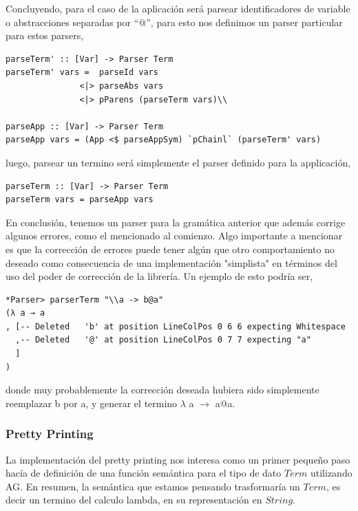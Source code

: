 \documentclass[a4paper,10pt]{article}
\begin{document}
Concluyendo, para el caso de la aplicación será parsear identificadores de variable
o abstracciones separadas por ``$@$'', para esto nos definimos un parser particular
para estos parsers,

\begin{lstlisting}
parseTerm' :: [Var] -> Parser Term
parseTerm' vars =  parseId vars
               <|> parseAbs vars
               <|> pParens (parseTerm vars)\\

parseApp :: [Var] -> Parser Term
parseApp vars = (App <$ parseAppSym) `pChainl` (parseTerm' vars)
\end{lstlisting}

luego, parsear un termino será simplemente el parser definido para la applicación,\\

\begin{lstlisting}
parseTerm :: [Var] -> Parser Term
parseTerm vars = parseApp vars
\end{lstlisting}

En conclusión, tenemos un parser para la gramática anterior que además corrige 
algunos errores, como el mencionado al comienzo. Algo importante a mencionar es
que la corrección de errores puede tener algún que otro comportamiento no deseado
como consecuencia de una implementación "simplista" en términos del uso del 
poder de corrección de la librería. Un ejemplo de esto podría ser,

\begin{verbatim}
*Parser> parserTerm "\\a -> b@a"
(λ a → a
, [-- Deleted   'b' at position LineColPos 0 6 6 expecting Whitespace
  ,-- Deleted   '@' at position LineColPos 0 7 7 expecting "a"
  ]
)
\end{verbatim}

donde muy probablemente la corrección deseada hubiera sido simplemente reemplazar
b por a, y generar el termino $\lambda$ a $\rightarrow$ a@a.

\subsubsection{Pretty Printing}

La implementación del pretty printing nos interesa como un primer pequeño paso
hacía de definición de una función semántica para el tipo de dato $Term$ utilizando
AG. En resumen, la semántica que estamos pensando trasformaría un $Term$, es decir
un termino del calculo lambda, en su representación en $String$.\\
\end{document}
